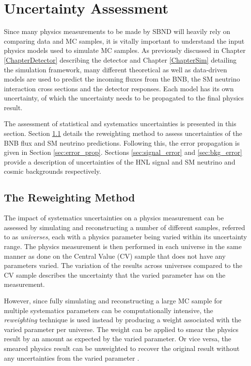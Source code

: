 \clearpage

\section{Uncertainty Assessment}
\label{sec:uncertainty}

Since many physics measurements to be made by SBND will heavily rely on comparing data and MC samples, it is vitally important to understand the input physics models used to simulate MC samples.
As previously discussed in Chapter \ref{ChapterDetector} describing the detector and Chapter \ref{ChapterSim} detailing the simulation framework, many different theoretical as well as data-driven models are used to predict the incoming fluxes from the BNB, the SM neutrino interaction cross sections and the detector responses.
Each model has its own uncertainty, of which the uncertainty needs to be propagated to the final physics result.

The assessment of statistical and systematics uncertainties is presented in this section.
Section \ref{sec:reweighting} details the reweighting method to assess uncertainties of the BNB flux and SM neutrino predictions.
Following this, the error propagation is given in Section \ref{sec:error_prop}.
Sections \ref{sec:signal_error} and \ref{sec:bkg_error} provide a description of uncertainties of the HNL signal and SM neutrino and cosmic backgrounds respectively.

\subsection{The Reweighting Method}
\label{sec:reweighting}

The impact of systematics uncertainties on a physics measurement can be assessed by simulating and reconstructing a number of different samples, referred to as \textit{universes}, each with a physics parameter being varied within its uncertainty range.
The physics measurement is then performed in each universe in the same manner as done on the Central Value (CV) sample that does not have any parameters varied.
The variation of the results across universes compared to the CV sample describes the uncertainty that the varied parameter has on the measurement.

However, since fully simulating and reconstructing a large MC sample for multiple systematics parameters can be computationally intensive, the \textit{reweighting} technique is used instead by producing a weight associated with the varied parameter per universe.
The weight can be applied to smear the physics result by an amount as expected by the varied parameter.
Or vice versa, the smeared physics result can be unweighted to recover the original result without any uncertainties from the varied parameter \cite{cowan_stat}.

